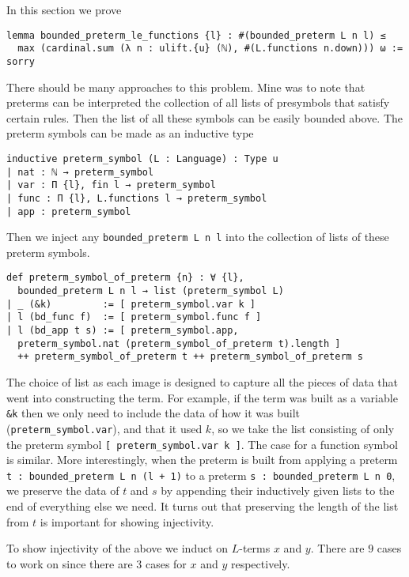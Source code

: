 \documentclass{article}
\newcommand{\<}{\langle}
\renewcommand{\>}{\rangle}
\theoremstyle{definitionstyle}
\theoremstyle{exercisestyle}
\theoremstyle{remarkstyle}
\begin{document}
In this section we prove

\begin{lstlisting}
lemma bounded_preterm_le_functions {l} : #(bounded_preterm L n l) ≤
  max (cardinal.sum (λ n : ulift.{u} (ℕ), #(L.functions n.down))) ω := sorry \end{lstlisting}

There should be many approaches to this problem.
Mine was to note that preterms can be interpreted
the collection of all lists of presymbols that satisfy certain rules.
Then the list of all these symbols can be easily bounded above.
The preterm symbols can be made as an inductive type
\begin{lstlisting}
inductive preterm_symbol (L : Language) : Type u
| nat : ℕ → preterm_symbol
| var : Π {l}, fin l → preterm_symbol
| func : Π {l}, L.functions l → preterm_symbol
| app : preterm_symbol \end{lstlisting}

Then we inject any \texttt{bounded\_preterm L n l}
into the collection of lists of these preterm symbols.

\begin{lstlisting}
def preterm_symbol_of_preterm {n} : ∀ {l},
  bounded_preterm L n l → list (preterm_symbol L)
| _ (&k)         := [ preterm_symbol.var k ]
| l (bd_func f)  := [ preterm_symbol.func f ]
| l (bd_app t s) := [ preterm_symbol.app,
  preterm_symbol.nat (preterm_symbol_of_preterm t).length ]
  ++ preterm_symbol_of_preterm t ++ preterm_symbol_of_preterm s
 \end{lstlisting}

The choice of list as each image is designed to capture all
the pieces of data that went into constructing the term.
For example, if the term was built as a variable \texttt{\&k}
then we only need to include the data of how it was built
(\texttt{preterm\_symbol.var}), and that it used $k$,
so we take the list consisting of only
the preterm symbol \texttt{[ preterm\_symbol.var k ]}.
The case for a function symbol is similar.
More interestingly, when the preterm is built from
applying a preterm \texttt{t : bounded\_preterm L n (l + 1)}
to a preterm \texttt{s : bounded\_preterm L n 0},
we preserve the data of $t$ and $s$ by appending their
inductively given lists to the end of everything else we need.
It turns out that preserving the length of the list from $t$
is important for showing injectivity.

To show injectivity of the above we induct on $L$-terms $x$ and $y$.
There are $9$ cases to work on since there are $3$ cases for $x$ and $y$
respectively.
\end{document}
